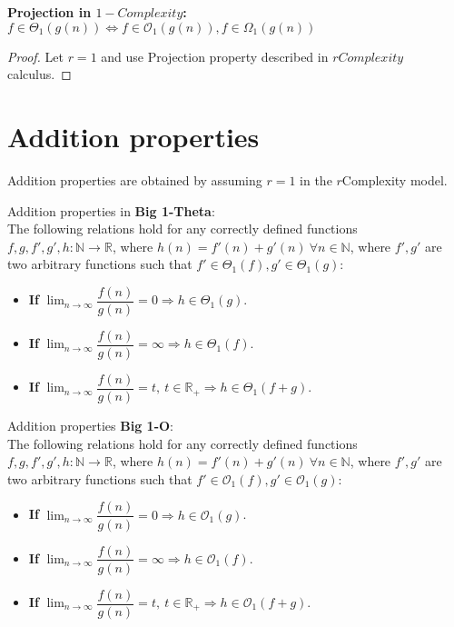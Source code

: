 \begin{theorem}
    \textbf{Projection in $1-Complexity$:}  \\  $ f \in \Theta_{1}(g(n)) \Leftrightarrow f \in \mathcal{O}_{1}(g(n)), f \in \Omega_{1}(g(n)) $
\end{theorem}
\begin{proof}
    Let $r = 1$ and use Projection property described in $rComplexity$ calculus.
\end{proof}


\section{Addition properties}
Addition properties are obtained by assuming $r = 1$ in the $r$Complexity model.
\begin{theorem}
    Addition properties in \textbf{Big 1-Theta}:  \\
    The following relations hold for any correctly defined functions $f, g, f', g', h:\mathbb{N}\longrightarrow\mathbb{R}$, where $ h(n) = f'(n) + g'(n)\  \forall n \in  \mathbb{N} $, where $f',g'$ are two arbitrary functions such that $ f' \in \Theta_{1}(f), g' \in \Theta_{1}(g) $:
    \begin{itemize}
        \item \textbf{If} $ \lim_{n\to\infty} \dfrac{f(n)}{g(n)} = 0 \Rightarrow  h \in \Theta_{1}(g) $.
        \item \textbf{If} $ \lim_{n\to\infty} \dfrac{f(n)}{g(n)} = \infty \Rightarrow  h \in \Theta_{1}(f) $.
        \item \textbf{If} $ \lim_{n\to\infty} \dfrac{f(n)}{g(n)} = t, \ t \in \mathbb{R}_{+} \Rightarrow  h \in \Theta_{1} \left( f + g \right) $.
    \end{itemize}
\end{theorem}

\begin{theorem}
    Addition properties \textbf{Big 1-O}: \\
    The following relations hold for any correctly defined functions $f, g, f', g', h:\mathbb{N}\longrightarrow\mathbb{R}$, where $ h(n) = f'(n) + g'(n)\  \forall n \in \mathbb{N} $, where $f',g'$ are two arbitrary functions such that $ f' \in \mathcal{O}_{1}(f), g' \in \mathcal{O}_{1}(g) $:
    \begin{itemize}
        \item \textbf{If} $ \lim_{n\to\infty} \dfrac{f(n)}{g(n)} = 0 \Rightarrow  h \in \mathcal{O}_{1}(g) $.
        \item \textbf{If} $ \lim_{n\to\infty} \dfrac{f(n)}{g(n)} = \infty \Rightarrow  h \in \mathcal{O}_{1}(f) $.
        \item \textbf{If} $ \lim_{n\to\infty} \dfrac{f(n)}{g(n)} = t, \ t \in \mathbb{R}_{+} \Rightarrow  h \in \mathcal{O}_{1} \left( f + g \right) $.
    \end{itemize}
\end{theorem}


